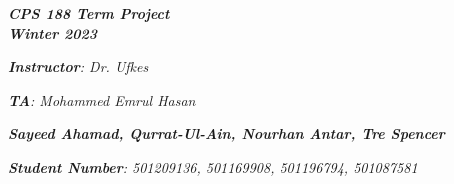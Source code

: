 

\begin{titlepage}
    \begin{center}
        \vspace*{1cm}
            
        \date{}
            
        \huge
            
			\vspace{-1.5cm}            
            
        \textit{\textbf{CPS 188 Term Project \\ Winter 2023}}
            
        \vspace{0.25cm}
            
            
        \vspace{2.5cm}
            
		\vspace{0.25cm}
            
            
        \LARGE

		\textit{\textbf{Instructor}: Dr. Ufkes}

		\textit
		{\textbf{TA}: Mohammed Emrul Hasan}


		\vspace{2.5cm}

		\textit{\textbf{Sayeed Ahamad, Qurrat-Ul-Ain, Nourhan Antar, Tre Spencer}}
            
            
        \Large         

		\vspace{5cm}

		\vspace{0cm}            
            
		\Large		
		        
		\vspace{0.25cm} 
		
		\textit{\textbf{Student Number}: 501209136, 501169908, 501196794, 501087581}
            
        \vspace{2cm}
            
        \Large
         
		\vspace{0.25cm}                  
            
        \vspace{0.25cm}
           
            
    \end{center}
\end{titlepage}



